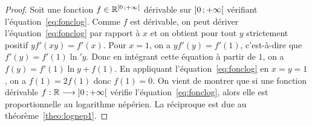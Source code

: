 \begin{proof}
    Soit une fonction \(f \in \mathbb{R}^{\left] 0 \, ;  +\infty \right[}\) dérivable sur 
    \(\left] 0 \, ;  +\infty \right[\) vérifiant l'équation~\eqref{eq:fonclog}. Comme \(f\) 
    est dérivable, on peut dériver l'équation~\eqref{eq:fonclog} par rapport 
    à \(x\) et on obtient pour tout \(y\) strictement positif 
    \(yf'(xy)=f'(x)\). Pour \(x=1\), on a \(yf'(y)=f'(1)\), c'est-à-dire que 
    \(f'(y)=f'(1) \ln' y\). Donc en intégrant cette équation à partir de 
    \(1\), on a \(f(y)=f'(1)\ln y + f(1)\). En appliquant 
    l'équation~\eqref{eq:fonclog} en \(x=y=1\), on a \(f(1)=2f(1)\) donc 
    \(f(1)=0\).
    On vient de montrer que si une fonction dérivable 
    \(f:\mathbb{R} \longrightarrow \left] 0 \, ;  +\infty \right[\) vérifie 
    l'équation~\eqref{eq:fonclog}, alors elle est proportionnelle au 
    logarithme népérien. La réciproque est due au 
    théorème~\ref{theo:lognep1}.
\end{proof}
